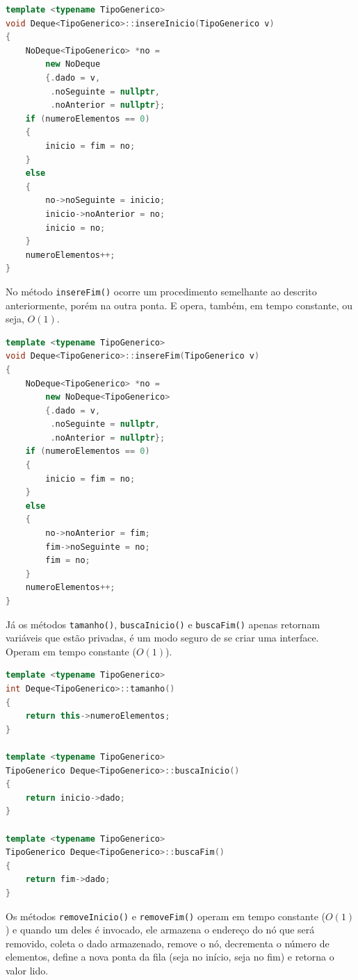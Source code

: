 \documentclass[
  brazilian,
  paper=a4,
  oneside  ,captions=tableheading
]{scrbook}
\newcommand{\passthrough}[1]{#1}
\begin{document}
\begin{lstlisting}[language={C++}]
template <typename TipoGenerico>
void Deque<TipoGenerico>::insereInicio(TipoGenerico v)
{
    NoDeque<TipoGenerico> *no =
        new NoDeque
        {.dado = v,
         .noSeguinte = nullptr,
         .noAnterior = nullptr};
    if (numeroElementos == 0)
    {
        inicio = fim = no;
    }
    else 
    {
        no->noSeguinte = inicio;
        inicio->noAnterior = no;
        inicio = no;
    }
    numeroElementos++;
}
\end{lstlisting}

No método \passthrough{\lstinline!insereFim()!} ocorre um procedimento
semelhante ao descrito anteriormente, porém na outra ponta. E opera,
também, em tempo constante, ou seja, \(O(1)\).

\begin{lstlisting}[language={C++}]
template <typename TipoGenerico>
void Deque<TipoGenerico>::insereFim(TipoGenerico v)
{
    NoDeque<TipoGenerico> *no =
        new NoDeque<TipoGenerico> 
        {.dado = v,
         .noSeguinte = nullptr,
         .noAnterior = nullptr};
    if (numeroElementos == 0)
    {
        inicio = fim = no;
    }
    else
    {
        no->noAnterior = fim;
        fim->noSeguinte = no;
        fim = no;
    }
    numeroElementos++;
}
\end{lstlisting}

Já os métodos \passthrough{\lstinline!tamanho()!},
\passthrough{\lstinline!buscaInicio()!} e
\passthrough{\lstinline!buscaFim()!} apenas retornam variáveis que estão
privadas, é um modo seguro de se criar uma interface. Operam em tempo
constante (\(O(1)\)).

\begin{lstlisting}[language={C++}]
template <typename TipoGenerico>
int Deque<TipoGenerico>::tamanho()
{
    return this->numeroElementos;
}

template <typename TipoGenerico>
TipoGenerico Deque<TipoGenerico>::buscaInicio()
{
    return inicio->dado;
}

template <typename TipoGenerico>
TipoGenerico Deque<TipoGenerico>::buscaFim()
{ 
    return fim->dado;
}
\end{lstlisting}

Os métodos \passthrough{\lstinline!removeInicio()!} e
\passthrough{\lstinline!removeFim()!} operam em tempo constante
(\(O(1)\)) e quando um deles é invocado, ele armazena o endereço do nó
que será removido, coleta o dado armazenado, remove o nó, decrementa o
número de elementos, define a nova ponta da fila (seja no início, seja
no fim) e retorna o valor lido.
\end{document}
